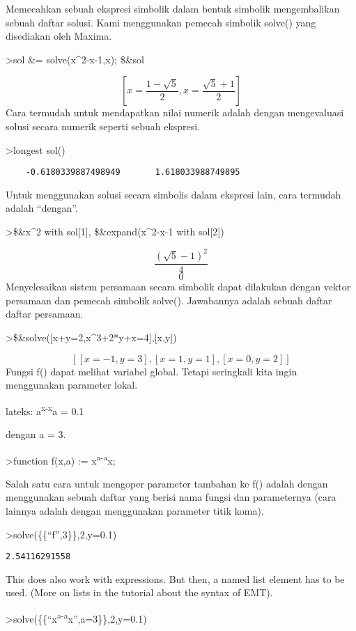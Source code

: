 \documentclass[
]{book}
\begin{document}
Memecahkan sebuah ekspresi simbolik dalam bentuk simbolik mengembalikan sebuah daftar solusi. Kami menggunakan pemecah simbolik solve() yang disediakan oleh Maxima.

\textgreater sol \&= solve(x\^{}2-x-1,x); \$\&sol

\[\left[ x=\frac{1-\sqrt{5}}{2} , x=\frac{\sqrt{5}+1}{2} \right] \]Cara termudah untuk mendapatkan nilai numerik adalah dengan mengevaluasi solusi secara numerik seperti sebuah ekspresi.

\textgreater longest sol()

\begin{verbatim}
    -0.6180339887498949       1.618033988749895 
\end{verbatim}

Untuk menggunakan solusi secara simbolis dalam ekspresi lain, cara termudah adalah ``dengan''.

\textgreater\$\&x\^{}2 with sol{[}1{]}, \$\&expand(x\^{}2-x-1 with sol{[}2{]})

\[\frac{\left(\sqrt{5}-1\right)^2}{4}\]\[0\]Menyelesaikan sistem persamaan secara simbolik dapat dilakukan dengan vektor persamaan dan pemecah simbolik solve(). Jawabannya adalah sebuah daftar daftar persamaan.

\textgreater\$\&solve({[}x+y=2,x\^{}3+2*y+x=4{]},{[}x,y{]})

\[\left[ \left[ x=-1 , y=3 \right]  , \left[ x=1 , y=1 \right]  , 
 \left[ x=0 , y=2 \right]  \right] \]Fungsi f() dapat melihat variabel global. Tetapi seringkali kita ingin menggunakan parameter lokal.

lateks: a\textsuperscript{x-x}a = 0.1

dengan a = 3.

\textgreater function f(x,a) := x\textsuperscript{a-a}x;

Salah satu cara untuk mengoper parameter tambahan ke f() adalah dengan menggunakan sebuah daftar yang berisi nama fungsi dan parameternya (cara lainnya adalah dengan menggunakan parameter titik koma).

\textgreater solve(\{\{``f'',3\}\},2,y=0.1)

\begin{verbatim}
2.54116291558
\end{verbatim}

This does also work with expressions. But then, a named list element has to be used. (More on lists in the tutorial about the syntax of EMT).

\textgreater solve(\{\{``x\textsuperscript{a-a}x'',a=3\}\},2,y=0.1)
\end{document}
